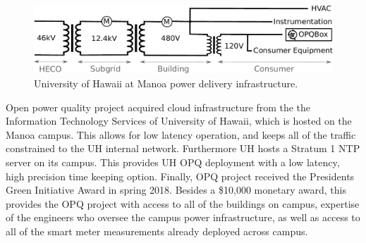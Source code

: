 \begin{figure}[h]
	\centering
	\includegraphics[width=1\linewidth]{img/uh-grid.pdf}	
	\caption{University of Hawaii at Manoa power delivery infrastructure.}
	\label{expdes:fig:3}
\end{figure}

Open power quality project acquired cloud infrastructure from the the Information Technology Services of University of Hawaii, which is hosted on the Manoa campus. This allows for low latency operation, and keeps all of the traffic constrained to the UH internal network. Furthermore UH hosts a Stratum 1 NTP server on its campus. This provides UH OPQ deployment with a low latency, high precision time keeping option. Finally, OPQ project received the Presidents Green Initiative Award in spring 2018. Besides a \$10,000 monetary award, this provides the OPQ project with access to all of the buildings on campus, expertise of the engineers who oversee the campus power infrastructure, as well as access to all of the smart meter measurements already deployed across campus. 

